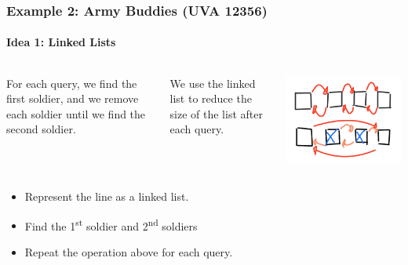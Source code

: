 \begin{frame}
  \frametitle{Example 2: Army Buddies (UVA 12356)}
  \framesubtitle{Idea 1: Linked Lists}

  \begin{columns}
    For each query, we find the first soldier, and we remove each soldier
    until we find the second soldier.\bigskip

    We use the linked list to reduce the size of the list after each query.
    \begin{center}
      \includegraphics[width=1\textwidth]{img/army-list}
    \end{center}
  \end{columns}

  \begin{itemize}
  \item Represent the line as a linked list.
  \item Find the 1\textsuperscript{st} soldier and 2\textsuperscript{nd} soldiers \hfill {}
  \item Repeat the operation above for each query. \hfill {}
  \end{itemize}
  \bigskip

\end{frame}

